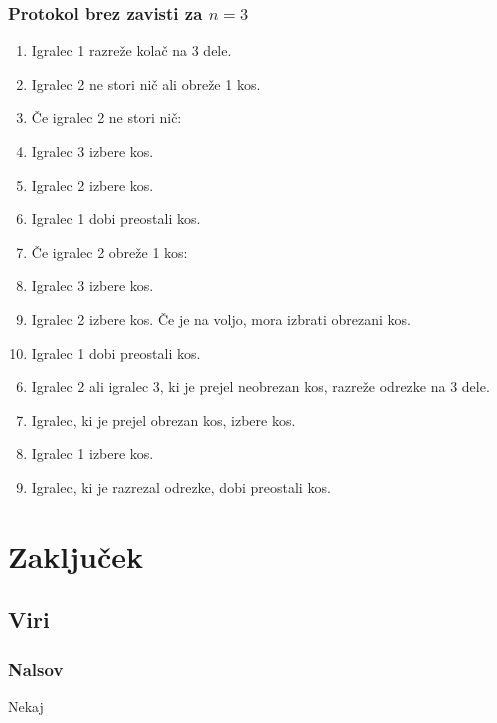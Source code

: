 \documentclass{beamer}
\begin{document}
	\begin{frame}
		\frametitle{Protokol brez zavisti za $n = 3$}
		\begin{enumerate}
			\item Igralec 1 razreže kolač na 3 dele.
			
			\item Igralec 2 ne stori nič ali obreže 1 kos.
			
			\item[] Če igralec 2 ne stori nič:
			
			\item \qquad Igralec 3 izbere kos.
			
			\item \qquad Igralec 2 izbere kos.
			
			\item \qquad Igralec 1 dobi preostali kos.
			
			\item[] Če igralec 2 obreže 1 kos:
			
			\setcounter{enumi}{2}
			
			\item \qquad Igralec 3 izbere kos.
			
			\item \qquad Igralec 2 izbere kos. Če je na voljo, mora izbrati obrezani kos.
			
			\item \qquad Igralec 1 dobi preostali kos.
		\end{enumerate}
	\end{frame}
	
	\begin{frame}
		\begin{enumerate}			
			\setcounter{enumi}{5}
			
			\item \qquad Igralec 2 ali igralec 3, ki je prejel neobrezan kos, razreže odrezke na 3 dele.
			
			\item \qquad Igralec, ki je prejel obrezan kos, izbere kos.
			
			\item \qquad Igralec 1 izbere kos.
			
			\item \qquad Igralec, ki je razrezal odrezke, dobi preostali kos.
		\end{enumerate}
	\end{frame}



	\section{Zaključek}
	
	\subsection{Viri}
	
	\begin{frame}
		\frametitle{Nalsov}
		Nekaj
	\end{frame}
\end{document}
